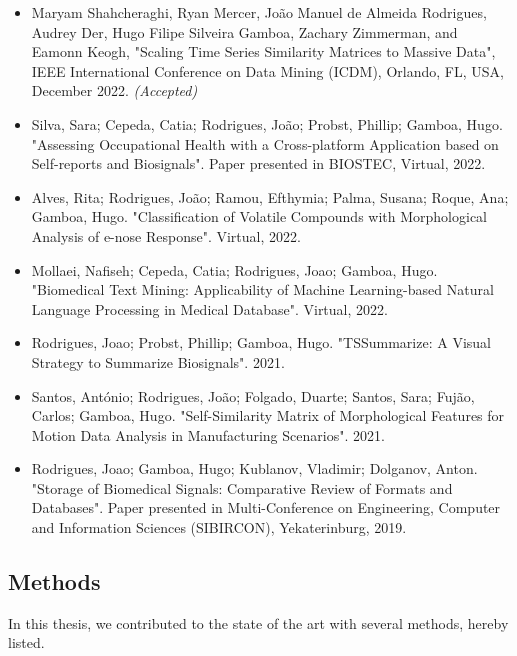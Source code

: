 \begin{itemize}

\item Maryam Shahcheraghi, Ryan Mercer, João Manuel de Almeida Rodrigues, Audrey Der, Hugo Filipe Silveira Gamboa, Zachary Zimmerman, and Eamonn Keogh, "Scaling Time Series Similarity Matrices to Massive Data", IEEE International Conference on Data Mining (ICDM), Orlando, FL, USA, December 2022. \textit{(Accepted)}

\item Silva, Sara; Cepeda, Catia; Rodrigues, João; Probst, Phillip; Gamboa, Hugo. "Assessing Occupational Health with a Cross-platform Application based on Self-reports and Biosignals". Paper presented in BIOSTEC, Virtual, 2022.

\item Alves, Rita; Rodrigues, João; Ramou, Efthymia; Palma, Susana; Roque, Ana; Gamboa, Hugo. "Classification of Volatile Compounds with Morphological Analysis of e-nose Response". Virtual, 2022.

\item Mollaei, Nafiseh; Cepeda, Catia; Rodrigues, Joao; Gamboa, Hugo. "Biomedical Text Mining: Applicability of Machine Learning-based Natural Language Processing in Medical Database". Virtual, 2022.

\item Rodrigues, Joao; Probst, Phillip; Gamboa, Hugo. "TSSummarize: A Visual Strategy to Summarize Biosignals". 2021.

\item Santos, António; Rodrigues, João; Folgado, Duarte; Santos, Sara; Fujão, Carlos; Gamboa, Hugo. "Self-Similarity Matrix of Morphological Features for Motion Data Analysis in Manufacturing Scenarios". 2021.

\item Rodrigues, Joao; Gamboa, Hugo; Kublanov, Vladimir; Dolganov, Anton. "Storage of Biomedical Signals: Comparative Review of Formats and Databases". Paper presented in Multi-Conference on Engineering, Computer and Information Sciences (SIBIRCON), Yekaterinburg, 2019.

\end{itemize}

\subsection{Methods}

In this thesis, we contributed to the state of the art with several methods, hereby listed.

